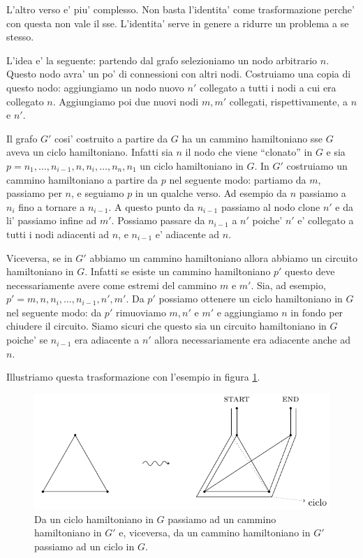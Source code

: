 L'altro verso e' piu' complesso. Non basta l'identita' come trasformazione perche' con questa non
vale il sse. L'identita' serve in genere a ridurre un problema a se stesso.

L'idea e' la seguente: partendo dal grafo selezioniamo un nodo arbitrario $n$. Questo nodo avra' un
po' di connessioni con altri nodi. Costruiamo una copia di questo nodo: aggiungiamo un nodo nuovo
$n'$ collegato a tutti i nodi a cui era collegato $n$. Aggiungiamo poi due nuovi nodi $m,m'$
collegati, rispettivamente, a $n$ e $n'$.

Il grafo $G'$ cosi' costruito a partire da $G$ ha un cammino hamiltoniano sse $G$ aveva un ciclo
hamiltoniano. Infatti sia $n$ il nodo che viene ``clonato'' in $G$ e sia $p = n_{1}, \dotsc,
n_{i-1}, n, n_{i}, \dotsc, n_{n}, n_{1}$ un ciclo hamiltoniano in $G$. In $G'$ costruiamo un cammino
hamiltoniano a partire da $p$ nel seguente modo: partiamo da $m$, passiamo per $n$, e seguiamo $p$
in un qualche verso. Ad esempio da $n$ passiamo a $n_{i}$ fino a tornare a $n_{i-1}$. A questo punto
da $n_{i-1}$ passiamo al nodo clone $n'$ e da li' passiamo infine ad $m'$. Possiamo passare da
$n_{i-1}$ a $n'$ poiche' $n'$ e' collegato a tutti i nodi adiacenti ad $n$, e $n_{i-1}$ e' adiacente
ad $n$.

Viceversa, se in $G'$ abbiamo un cammino hamiltoniano allora abbiamo un circuito hamiltoniano in
$G$. Infatti se esiste un cammino hamiltoniano $p'$ questo deve necessariamente avere come estremi
del cammino $m$ e $m'$. Sia, ad esempio, $p' = m, n, n_{i},\dotsc, n_{i-1}, n', m'$. Da $p'$
possiamo ottenere un ciclo hamiltoniano in $G$ nel seguente modo: da $p'$ rimuoviamo $m, n'$ e $m'$
e aggiungiamo $n$ in fondo per chiudere il circuito. Siamo sicuri che questo sia un circuito
hamiltoniano in $G$ poiche' se $n_{i-1}$ era adiacente a $n'$ allora necessariamente era adiacente
anche ad $n$.

Illustriamo questa trasformazione con l'esempio in figura \ref{img:HAMCYCLEPATH}.

\begin{figure}[h]
    \begin{center}
        \includegraphics{./img/NPClass/HAMCYCLEPATH.pdf}
        \caption{Da un ciclo hamiltoniano in $G$ passiamo ad un cammino hamiltoniano in $G'$ e,
        viceversa, da un cammino hamiltoniano in $G'$ passiamo ad un ciclo in $G$.}
        \label{img:HAMCYCLEPATH}
    \end{center}
\end{figure}

